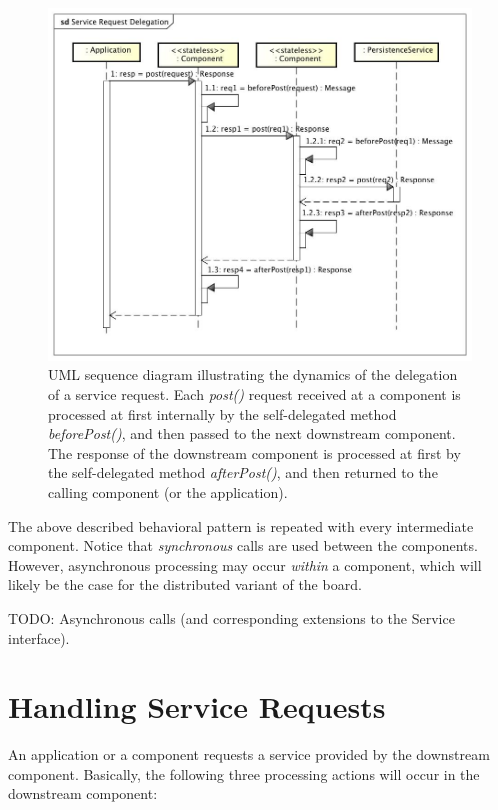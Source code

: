 \documentclass[oneside]{scrreprt}
\begin{document}
\begin{figure}[ht]
\centerline{
\includegraphics[width=1.0\textwidth]{figs/service-request-delegation}}
\caption{UML sequence diagram illustrating the dynamics of the
delegation of a service request. Each \emph{post()} request received
at a component is processed at first internally by the
self-delegated method \emph{beforePost()}, and then passed to
the next downstream component. The response of the downstream
component is processed at first by the self-delegated
method \emph{afterPost()}, and then returned to the calling
component (or the application).}
\label{fig:service-request-delegation}
\end{figure}

The above described behavioral pattern is repeated with
every intermediate component. Notice that \emph{synchronous} calls
are used between the components.
However, asynchronous processing may occur \emph{within}
a component, which will likely be the case for the
distributed variant of the board.

TODO: Asynchronous calls
(and corresponding extensions to the Service interface).


\section{Handling Service Requests}

An application or a component requests a service provided by
the downstream component. Basically, the following three
processing actions will occur in the downstream component:
\end{document}
